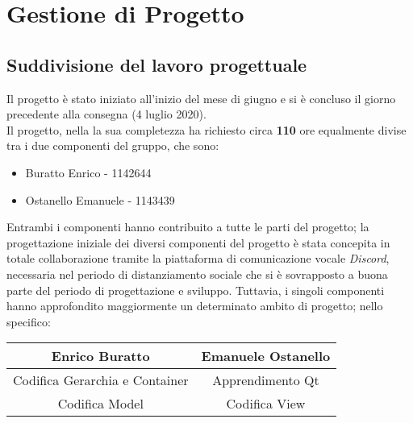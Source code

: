 \section{Gestione di Progetto}

\subsection{Suddivisione del lavoro progettuale}
Il progetto è stato iniziato all'inizio del mese di giugno e si è concluso il giorno precedente alla consegna (4 luglio 2020).\\
Il progetto, nella la sua completezza ha richiesto circa \textbf{110} ore equalmente divise tra i due componenti del gruppo, che sono:
\begin{itemize}
    \item Buratto Enrico - 1142644
    \item Ostanello Emanuele - 1143439
\end{itemize}
Entrambi i componenti hanno contribuito a tutte le parti del progetto; la progettazione iniziale dei diversi componenti del progetto è stata concepita in totale collaborazione tramite la piattaforma di comunicazione vocale \textit{Discord}, necessaria nel periodo di distanziamento sociale che si è sovrapposto a buona parte del periodo di progettazione e sviluppo. Tuttavia, i singoli componenti hanno approfondito maggiormente un determinato ambito di progetto; nello specifico:
\begin{table}[H]
\begin{center}
\begin{tabular}{c|c}
\textbf{Enrico Buratto}        & \textbf{Emanuele Ostanello} \\ \hline
Codifica Gerarchia e Container & Apprendimento Qt            \\
Codifica Model                 & Codifica View              
\end{tabular}
\end{center}
\end{table}

